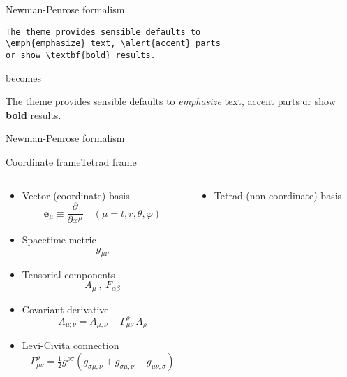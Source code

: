\documentclass[9pt,serif,mathserif]{beamer}
\begin{document}
\begin{frame}[fragile]{Newman-Penrose formalism}
    \begin{verbatim}The theme provides sensible defaults to
\emph{emphasize} text, \alert{accent} parts
or show \textbf{bold} results.\end{verbatim}

\begin{center}becomes\end{center}

The theme provides sensible defaults to \emph{emphasize} text,
\alert{accent} parts or show \textbf{bold} results.
\end{frame}

\begin{frame}{Newman-Penrose formalism}
    \begin{block}{\hspace{1.0cm}\alert{Coordinate frame}\hspace{3.5cm}\alert{Tetrad frame}}
        \vspace{0.45cm}
        \begin{columns}[T,onlytextwidth]        
            \begin{column}{0.5\textwidth}
                \begin{itemize}
                    \item Vector (coordinate) basis
                    $$\bm{e}_\mu \equiv \frac{\partial}{\partial x^\mu} \quad (\mu = t,r,\theta,\varphi)$$
                    \item Spacetime metric
                    $$g_{\mu\nu}$$
                    \item Tensorial components
                    $$ A_\mu ~,~ F_{\alpha\beta} $$
                    \item Covariant derivative
                    $$ A_{\mu;\nu} = A_{\mu,\nu} - \Gamma_{\mu\nu}^\rho \,A_\rho $$
                    \item Levi-Civita connection
                    $$\Gamma^\rho_{\mu\nu} = \tfrac{1}{2} g^{\rho\sigma} (g_{\sigma\mu,\nu}+g_{\sigma\mu,\nu}-g_{\mu\nu,\sigma})$$
                \end{itemize}
            \end{column}
            \vrule{}
            \begin{column}{0.5\textwidth}
                \begin{itemize}
                    \item Tetrad (non-coordinate) basis

\end{itemize}
\end{column}
\end{columns}
\end{block}
\end{frame}
\end{document}

